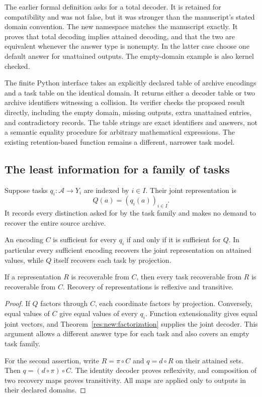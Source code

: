 The earlier formal definition  asks for a total decoder. It is retained for compatibility and was not false, but it was stronger than the manuscript's stated domain convention. The new namespace  matches the manuscript exactly. It proves that total decoding implies attained decoding, and that the two are equivalent whenever the answer type is nonempty. In the latter case choose one default answer for unattained outputs. The empty-domain example is also kernel checked.

The finite Python interface  takes an explicitly declared table of archive encodings and a task table on the identical domain. It returns either a decoder table or two archive identifiers witnessing a collision. Its verifier checks the proposed result directly, including the empty domain, missing outputs, extra unattained entries, and contradictory records. The table strings are exact identifiers and answers, not a semantic equality procedure for arbitrary mathematical expressions. The existing retention-based  function remains a different, narrower task model.

\subsection{The least information for a family of tasks}
\label{sec:joint-recovery}

Suppose tasks $q_i:\mathscr A\to Y_i$ are indexed by $i\in I$. Their joint representation is
\[
 Q(a)=(q_i(a))_{i\in I}.
\]
It records every distinction asked for by the task family and makes no demand to recover the entire source archive.

\begin{theorem}
\label{res:new:joint}
An encoding $C$ is sufficient for every $q_i$ if and only if it is sufficient for $Q$. In particular every sufficient encoding recovers the joint representation on attained values, while $Q$ itself recovers each task by projection.

If a representation $R$ is recoverable from $C$, then every task recoverable from $R$ is recoverable from $C$. Recovery of representations is reflexive and transitive.
\end{theorem}
\begin{proof}
If $Q$ factors through $C$, each coordinate factors by projection. Conversely, equal values of $C$ give equal values of every $q_i$. Function extensionality gives equal joint vectors, and Theorem~\ref{res:new:factorization} supplies the joint decoder. This argument allows a different answer type for each task and also covers an empty task family.

For the second assertion, write $R=\pi\circ C$ and $q=d\circ R$ on their attained sets. Then $q=(d\circ\pi)\circ C$. The identity decoder proves reflexivity, and composition of two recovery maps proves transitivity. All maps are applied only to outputs in their declared domains.
\end{proof}

